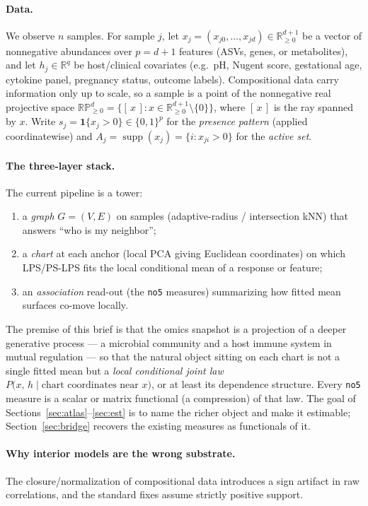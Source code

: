\documentclass[11pt]{article}
\theoremstyle{definition}
\theoremstyle{plain}
\theoremstyle{remark}
\newcommand{\R}{\mathbb{R}}
\newcommand{\Rnn}{\R^{d+1}_{\ge 0}}
\newcommand{\RPnn}{\mathbb{RP}^{d}_{\ge 0}}
\newcommand{\supp}{\operatorname{supp}}
\newcommand{\1}{\mathbf{1}}
\begin{document}
\paragraph{Data.}
We observe $n$ samples. For sample $j$, let $x_j=(x_{j0},\dots,x_{jd})\in\Rnn$ be
a vector of nonnegative abundances over $p=d+1$ features (ASVs, genes, or
metabolites), and let $h_j\in\R^{q}$ be host/clinical covariates (e.g.\ pH,
Nugent score, gestational age, cytokine panel, pregnancy status, outcome
labels). Compositional data carry information only up to scale, so a sample is a
point of the nonnegative real projective space
$\RPnn=\{[\,x\,] : x\in\Rnn\setminus\{0\}\}$, where $[\,x\,]$ is the ray spanned
by $x$. Write $s_j=\1\{x_j>0\}\in\{0,1\}^{p}$ for the \emph{presence pattern}
(applied coordinatewise) and $A_j=\supp(x_j)=\{i:x_{ji}>0\}$ for the
\emph{active set}.

\paragraph{The three-layer stack.}
The current pipeline is a tower:
\begin{enumerate}[label=(\roman*)]
\item a \emph{graph} $G=(V,E)$ on samples (adaptive-radius / intersection kNN)
  that answers ``who is my neighbor'';
\item a \emph{chart} at each anchor (local PCA giving Euclidean coordinates) on
  which LPS/PS-LPS fits the local conditional mean of a response or feature;
\item an \emph{association} read-out (the \texttt{no5} measures) summarizing how
  fitted mean surfaces co-move locally.
\end{enumerate}
The premise of this brief is that the omics snapshot is a projection of a deeper
generative process --- a microbial community and a host immune system in mutual
regulation --- so that the natural object sitting on each chart is not a single
fitted mean but a \emph{local conditional joint law}
$P\big(x,\,h \mid \text{chart coordinates near } x\big)$, or at least its
dependence structure. Every \texttt{no5} measure is a scalar or matrix functional
(a compression) of that law. The goal of Sections~\ref{sec:atlas}--\ref{sec:est}
is to name the richer object and make it estimable; Section~\ref{sec:bridge}
recovers the existing measures as functionals of it.

\paragraph{Why interior models are the wrong substrate.}
The closure/normalization of compositional data introduces a sign artifact in
raw correlations, and the standard fixes assume strictly positive support.
\end{document}
